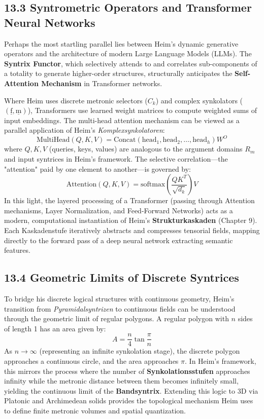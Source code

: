 \documentclass[12pt]{article}
\begin{document}
\subsection{13.3 Syntrometric Operators and Transformer Neural Networks}
Perhaps the most startling parallel lies between Heim's dynamic generative operators and the architecture of modern Large Language Models (LLMs). The \textbf{Syntrix Functor}, which selectively attends to and correlates sub-components of a totality to generate higher-order structures, structurally anticipates the \textbf{Self-Attention Mechanism} in Transformer networks. 

Where Heim uses discrete metronic selectors ($C_k$) and complex synkolators ($(\underline{\mathrm{f}}, \underline{\mathrm{m}})$), Transformers use learned weight matrices to compute weighted sums of input embeddings. The multi-head attention mechanism can be viewed as a parallel application of Heim's \textit{Komplexsynkolatoren}:
\begin{equation*}
\text{MultiHead}(Q, K, V) = \text{Concat}(\text{head}_1, \text{head}_2, \dots, \text{head}_h)W^O
\end{equation*}
where $Q, K, V$ (queries, keys, values) are analogous to the argument domains $R_m$ and input syntrices in Heim's framework. The selective correlation—the "attention" paid by one element to another—is governed by:
\begin{equation*}
\text{Attention}(Q, K, V) = \text{softmax}\left(\frac{QK^T}{\sqrt{d_k}}\right)V
\end{equation*}
In this light, the layered processing of a Transformer (passing through Attention mechanisms, Layer Normalization, and Feed-Forward Networks) acts as a modern, computational instantiation of Heim's \textbf{Strukturkaskaden} (Chapter 9). Each Kaskadenstufe iteratively abstracts and compresses tensorial fields, mapping directly to the forward pass of a deep neural network extracting semantic features.

\subsection{13.4 Geometric Limits of Discrete Syntrices}
To bridge his discrete logical structures with continuous geometry, Heim's transition from \textit{Pyramidalsyntrizen} to continuous fields can be understood through the geometric limit of regular polygons. A regular polygon with $n$ sides of length 1 has an area given by:
\begin{equation*}
A = \frac{n}{4} \tan \frac{\pi}{n}
\end{equation*}
As $n \to \infty$ (representing an infinite synkolation stage), the discrete polygon approaches a continuous circle, and the area approaches $\pi$. In Heim's framework, this mirrors the process where the number of \textbf{Synkolationsstufen} approaches infinity while the metronic distance between them becomes infinitely small, yielding the continuous limit of the \textbf{Bandsyntrix}. Extending this logic to 3D via Platonic and Archimedean solids provides the topological mechanism Heim uses to define finite metronic volumes and spatial quantization.
\end{document}

